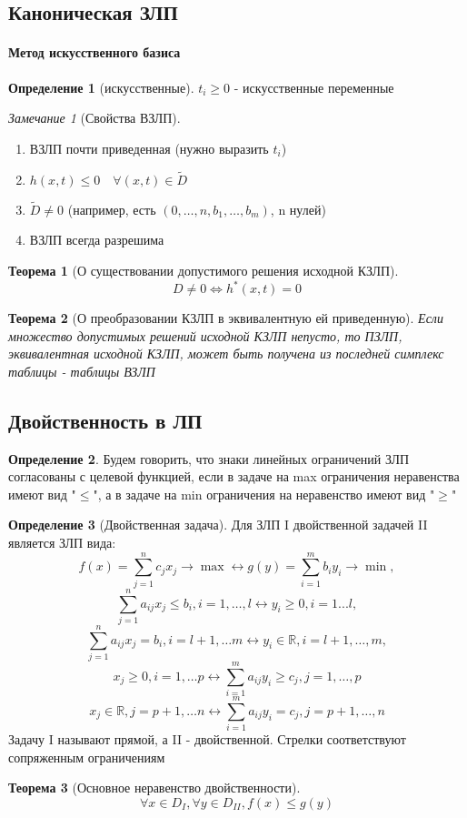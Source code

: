 \documentclass[a4paper]{article}
\newtheorem{theorem}{Теорема}[section]
\theoremstyle{definition}
\newtheorem*{definition}{Определение}
\theoremstyle{remark}
\newtheorem*{remark}{Замечание}
\begin{document}
\subsection{Каноническая ЗЛП}
\paragraph*{Метод искусственного базиса}
\begin{definition}[искусственные]
    $t_i\geq 0$ - искусственные переменные
\end{definition}
\begin{remark}[Свойства ВЗЛП]
    \begin{enumerate}
        \item ВЗЛП почти приведенная (нужно выразить $t_i$)
        \item $h(x, t) \leq 0 \quad \forall (x, t)\in \widetilde{D}$
        \item $\widetilde{D}\neq 0$ (например, есть $(0, \dots, n, b_1, \dots, b_m)$, n нулей)
        \item ВЗЛП всегда разрешима 
    \end{enumerate}
\end{remark}
\begin{theorem}[О существовании допустимого решения исходной КЗЛП]
    $$D\neq 0 \Leftrightarrow h^*(x, t)=0$$
\end{theorem}
\begin{theorem}[О преобразовании КЗЛП в эквивалентную ей приведенную]
    Если множество допустимых решений исходной КЗЛП непусто, то ПЗЛП, эквивалентная исходной КЗЛП, может быть получена из последней симплекс таблицы - таблицы ВЗЛП
\end{theorem}
\subsection{Двойственность в ЛП}
\begin{definition}
    Будем говорить, что знаки линейных ограничений ЗЛП согласованы с целевой функцией, если в задаче на max ограничения неравенства имеют вид "$\leq$", а в задаче на min ограничения на неравенство имеют вид "$\geq$"
\end{definition}
\begin{definition}[Двойственная задача]
    Для ЗЛП I двойственной задачей II является ЗЛП вида:
    $$f(x) = \sum_{j = 1}^n c_j x_j \to \max \leftrightarrow g(y) = \sum_{i = 1}^m b_i y_i\to \min,$$
    $$\sum_{j = 1}^n a_{ij} x_j \leq b_i, i = 1, \dots, l \leftrightarrow y_i\geq 0, i = 1...l,$$
    $$\sum_{j = 1}^n a_{ij} x_j = b_i, i = l+1, \dots m \leftrightarrow y_i\in \mathbb{R}, i = l+1, \dots, m,$$
    $$x_j\geq 0, i = 1, \dots p\leftrightarrow \sum_{i = 1}^m a_{ij} y_i \geq c_j, j = 1, \dots, p$$
    $$x_j \in \mathbb{R}, j = p+1, \dots n \leftrightarrow \sum_{i = 1}^m a_{ij} y_i = c_j, j = p+1, \dots, n$$
        Задачу I называют прямой, а II - двойственной. Стрелки соответствуют сопряженным ограничениям
\end{definition}
\begin{theorem}[Основное неравенство двойственности]
    $$\forall x\in D_I, \forall y\in D_{II}, f(x)\leq g(y)$$
\end{theorem}
\end{document}
